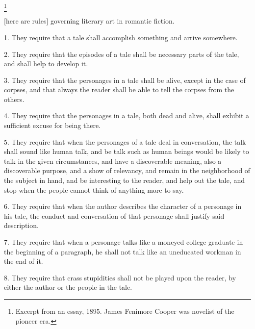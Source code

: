 \documentclass[../interior-demo.tex]{subfiles}
\begin{document}
\begin{upperpage}
\footnote{Excerpt from an essay, 1895. James Fenimore Cooper was
 novelist of the pioneer era.}
\end{upperpage}
[here are rules] governing literary art in romantic fiction.

1. They require that a tale shall accomplish something and arrive
somewhere.

2. They require that the episodes of a tale shall be necessary parts of
the tale, and shall help to develop it.

3. They require that the personages in a tale shall be alive, except in
the case of corpses, and that always the reader shall be able to tell
the corpses from the others.

4. They require that the personages in a tale, both dead and alive,
shall exhibit a sufficient excuse for being there.

5. They require that when the personages of a tale deal in conversation,
the talk shall sound like human talk, and be talk such as human
beings would be likely to talk in the given circumstances, and have
a discoverable meaning, also a discoverable purpose, and a show of
relevancy, and remain in the neighborhood of the subject in hand, and
be interesting to the reader, and help out the tale, and stop when the
people cannot think of anything more to say.

6. They require that when the author describes the character of a
personage in his tale, the conduct and conversation of that personage
shall justify said description.

7. They require that when a personage talks like a moneyed college
graduate in the beginning of a paragraph, he shall not talk like an uneducated
workman in the end of it.

8. They require that crass stupidities shall not be played upon the
reader, by either the author or the people in the tale.
\end{document}
